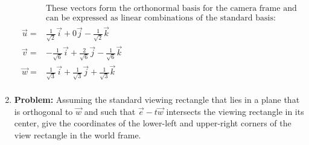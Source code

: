 \documentclass[a4paper, 12pt]{article}
\begin{document}
\begin{enumerate}
\begin{align*}
        &\text{These vectors form the orthonormal basis for the camera frame and}\\
        &\text{can be expressed as linear combinations of the standard basis:}\\
        \vec{u} =& \frac{1}{\sqrt{2}}\vec{i} + 0\vec{j} -\frac{1}{\sqrt{2}}\vec{k}\\
        \vec{v} =& -\frac{1}{\sqrt{6}}\vec{i} + \frac{2}{\sqrt{6}}\vec{j} -\frac{1}{\sqrt{6}}\vec{k}\\
        \vec{w} =& \frac{1}{\sqrt{3}}\vec{i} + \frac{1}{\sqrt{3}}\vec{j} + \frac{1}{\sqrt{3}}\vec{k}\\
        \end{align*}

    \item \textbf{Problem:} Assuming the standard viewing rectangle that lies in a plane that is orthogonal to \(\vec{w}\) and such that \(\vec{e} - t\vec{w}\) intersects the viewing rectangle in its center, give the coordinates of the lower-left and upper-right corners of the view rectangle in the world frame.


\end{enumerate}
\end{document}
